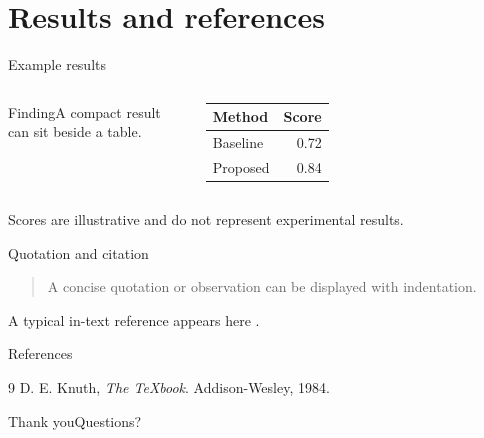 \documentclass[aspectratio=43]{beamer}
\begin{document}
\section{Results and references}
\begin{frame}{Example results}
  \begin{columns}[T]
      \begin{exampleblock}{Finding}A compact result can sit beside a table.\end{exampleblock}
      \centering
      \begin{tabular}{lr}\toprule Method & Score \\ \midrule Baseline & 0.72 \\ Proposed & 0.84 \\ \bottomrule\end{tabular}
  \end{columns}
  \vspace{0.6cm}
  {\small Scores are illustrative and do not represent experimental results.}
\end{frame}
\begin{frame}{Quotation and citation}
  \begin{quote}
    A concise quotation or observation can be displayed with indentation.
  \end{quote}
  A typical in-text reference appears here \cite{knuth1984}.
\end{frame}
\begin{frame}{References}
  \begin{thebibliography}{9}
     D. E. Knuth, \textit{The TeXbook}. Addison-Wesley, 1984.
  \end{thebibliography}
\end{frame}
\begin{frame}{Thank you}\centering\Large Questions?\end{frame}
\end{document}
